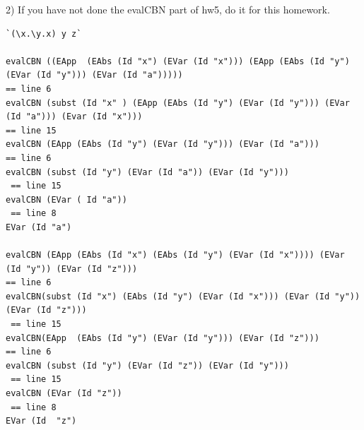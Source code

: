\documentclass{article}
\theoremstyle{theorem}
\theoremstyle{definition}
\theoremstyle{remark}
\begin{document}
2) If you have not done the evalCBN part of hw5, do it for this homework.
\begin{lstlisting}
`(\x.\y.x) y z`

evalCBN ((EApp  (EAbs (Id "x") (EVar (Id "x"))) (EApp (EAbs (Id "y") (EVar (Id "y"))) (EVar (Id "a")))))
== line 6
evalCBN (subst (Id "x" ) (EApp (EAbs (Id "y") (EVar (Id "y"))) (EVar (Id "a"))) (Evar (Id "x")))
== line 15
evalCBN (EApp (EAbs (Id "y") (EVar (Id "y"))) (EVar (Id "a")))
== line 6
evalCBN (subst (Id "y") (EVar (Id "a")) (EVar (Id "y")))
 == line 15
evalCBN (EVar ( Id "a"))
 == line 8
EVar (Id "a")

evalCBN (EApp (EAbs (Id "x") (EAbs (Id "y") (EVar (Id "x")))) (EVar (Id "y")) (EVar (Id "z")))
== line 6
evalCBN(subst (Id "x") (EAbs (Id "y") (EVar (Id "x"))) (EVar (Id "y")) (EVar (Id "z")))
 == line 15
evalCBN(EApp  (EAbs (Id "y") (EVar (Id "y"))) (EVar (Id "z")))
== line 6
evalCBN (subst (Id "y") (EVar (Id "z")) (EVar (Id "y")))
 == line 15
evalCBN (EVar (Id "z"))
 == line 8
EVar (Id  "z")
\end{lstlisting}
\end{document}
